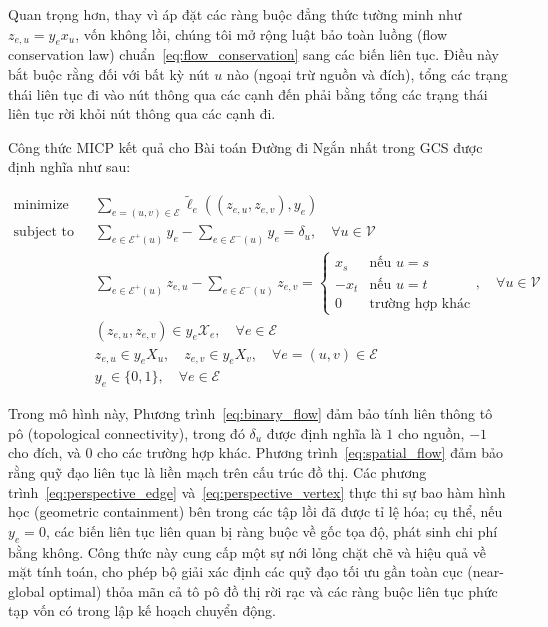 Quan trọng hơn, thay vì áp đặt các ràng buộc đẳng thức tường minh như $z_{e,u} = y_e x_u$, vốn không lồi, chúng tôi mở rộng luật bảo toàn luồng (flow conservation law) chuẩn~\eqref{eq:flow_conservation} sang các biến liên tục. Điều này bắt buộc rằng đối với bất kỳ nút $u$ nào (ngoại trừ nguồn và đích), tổng các trạng thái liên tục đi vào nút thông qua các cạnh đến phải bằng tổng các trạng thái liên tục rời khỏi nút thông qua các cạnh đi.

Công thức MICP kết quả cho Bài toán Đường đi Ngắn nhất trong GCS được định nghĩa như sau:

\begin{subequations}
\begin{align}
\text{minimize} \quad & \sum_{e=(u,v) \in \mathcal{E}} \tilde{\ell}_e((z_{e,u}, z_{e,v}), y_e) \label{eq:gcs_obj_perspective} \\
\text{subject to} \quad & \sum_{e \in \mathcal{E}^+(u)} y_e - \sum_{e \in \mathcal{E}^-(u)} y_e = \delta_u, \quad \forall u \in \mathcal{V} \label{eq:binary_flow} \\
& \sum_{e \in \mathcal{E}^+(u)} z_{e,u} - \sum_{e \in \mathcal{E}^-(u)} z_{e,v} = 
\begin{cases}
x_s & \text{nếu } u = s \\
-x_t & \text{nếu } u = t \\
0 & \text{trường hợp khác}
\end{cases}, \quad \forall u \in \mathcal{V} \label{eq:spatial_flow} \\
& (z_{e,u}, z_{e,v}) \in y_e \mathcal{X}_e, \quad \forall e \in \mathcal{E} \label{eq:perspective_edge} \\
& z_{e,u} \in y_e X_u, \quad z_{e,v} \in y_e X_v, \quad \forall e=(u,v) \in \mathcal{E} \label{eq:perspective_vertex} \\
& y_e \in \{0, 1\}, \quad \forall e \in \mathcal{E} \label{eq:binary_constraint}
\end{align}
\end{subequations}

Trong mô hình này, Phương trình~\eqref{eq:binary_flow} đảm bảo tính liên thông tô pô (topological connectivity), trong đó $\delta_u$ được định nghĩa là $1$ cho nguồn, $-1$ cho đích, và $0$ cho các trường hợp khác. Phương trình~\eqref{eq:spatial_flow} đảm bảo rằng quỹ đạo liên tục là liền mạch trên cấu trúc đồ thị. Các phương trình~\eqref{eq:perspective_edge} và~\eqref{eq:perspective_vertex} thực thi sự bao hàm hình học (geometric containment) bên trong các tập lồi đã được tỉ lệ hóa; cụ thể, nếu $y_e=0$, các biến liên tục liên quan bị ràng buộc về gốc tọa độ, phát sinh chi phí bằng không. Công thức này cung cấp một sự nới lỏng chặt chẽ và hiệu quả về mặt tính toán, cho phép bộ giải xác định các quỹ đạo tối ưu gần toàn cục (near-global optimal) thỏa mãn cả tô pô đồ thị rời rạc và các ràng buộc liên tục phức tạp vốn có trong lập kế hoạch chuyển động.


